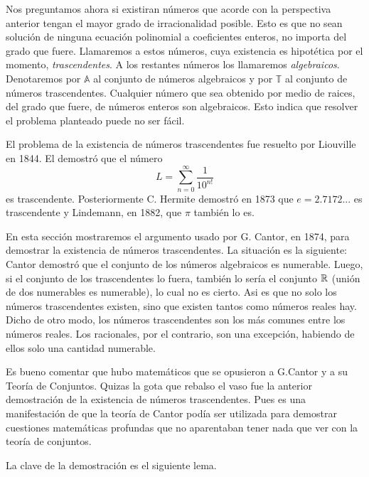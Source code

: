 Nos preguntamos ahora si existiran números que acorde con la perspectiva anterior tengan el mayor grado
de irracionalidad  posible. Esto es que no sean solución de
ninguna ecuación polinomial a coeficientes enteros, no importa
del grado que fuere. Llamaremos a estos números, cuya existencia
es hipotética por el momento, \emph{trascendentes}. A los
restantes números los llamaremos  \emph{algebraicos}. Denotaremos
por $\mathbb{A}$ al conjunto de números algebraicos y por
$\mathbb{T}$ al conjunto de números trascendentes. Cualquier
número que sea obtenido por medio de raices, del grado que
fuere, de números enteros son algebraicos. Esto indica que
resolver el problema planteado puede no ser fácil.

El problema de la existencia de números trascendentes fue
resuelto por Liouville en 1844. El demostró que el número
\[L=\sum_{n=0}^{\infty}\frac{1}{10^{n!}}\]
es trascendente. Posteriormente C. Hermite demostró en 1873
que $e=2.7172...$ es trascendente y Lindemann, en 1882, que $\pi$
también lo es.

En esta sección mostraremos el argumento usado por G. Cantor, en
1874, para demostrar la existencia de números trascendentes. La
situación es la siguiente: Cantor demostró que el conjunto de
los números algebraicos es numerable. Luego, si el conjunto de
los trascendentes lo fuera, también lo sería el conjunto
$\mathbb{R}$ (unión de dos numerables es numerable), lo cual no es
cierto. Asi es que no solo los números trascendentes existen,
sino que existen tantos como números reales hay. Dicho de otro
modo, los números trascendentes son los más comunes entre los
números reales. Los racionales, por el contrario, son una
excepción, habiendo de ellos solo una cantidad numerable.

Es bueno comentar que hubo matemáticos  que se opusieron a
G.Cantor y a su Teoría de Conjuntos. Quizas la gota que
rebalso el vaso fue la anterior demostración de la existencia
de números trascendentes. Pues es una manifestación de que la 
teoría de Cantor podía ser utilizada para demostrar cuestiones 
matemáticas profundas que no aparentaban tener nada que ver con
la teoría de conjuntos.

La clave de la demostración es el siguiente lema.


